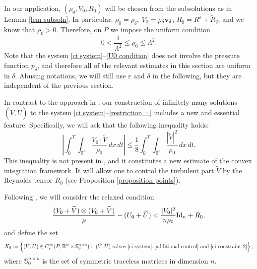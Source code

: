 \documentclass[12pt,reqno]{amsart}
\theoremstyle{definition}
\theoremstyle{remark}
\numberwithin{equation}{section}
\newcommand{\R}{{\mathbb R}}
\newcommand{\id}{\mathrm{Id}}
\renewcommand{\v}{{\bf v}}
\begin{document}
In our application, $(\rho_0, V_0, R_0)$ will be chosen from the subsolutions as in Lemma \ref{lem subsoln}. In particular, $\rho_0 = \rho_\delta$, $V_0 = \rho_\delta \v_\delta$, $R_0 = R^{\varepsilon}+\tilde{R}_{\delta}$, and we know that $\rho_0 > 0$. Therefore, on $P$ we impose the uniform condition
\begin{equation}
 \label{bounds rho}
 0<\frac{1}{\Lambda^2}\leq \rho_0\leq \Lambda^2.
 \end{equation}
Note that the system \eqref{ci system}--\eqref{U0 condition} does not involve the pressure function $p_\delta$, and therefore all of the relevant estimates in this section are uniform in $\delta$. Abusing notations, we will still use $\varepsilon$ and $\delta$ in the following, but they are independent of the previous section. 

In contrast to the approach in \cite{CVY}, our construction of infinitely many solutions $ (\widetilde{V}, \widetilde{U}) $ to the system \eqref{ci system}--\eqref{restriction =} includes a new and essential feature. Specifically, we will ask that the following  inequality holds:
\begin{equation}
\label{additional control}
\left|\int_0^T\int_{\mathbb{T}^3}\frac{V_0\cdot\widetilde{V}}{\rho_0}\,dx\,dt\right|\leq \frac{1}{8}\int_0^T\int_{\mathbb{T}^3} \frac{|\widetilde{V}|^2}{\rho_0}\,dx\,dt.
\end{equation}
This inequality is not present in \cite{CVY}, and it constitutes a new estimate of the convex integration framework. It will allow one to control the turbulent part $\widetilde V$ by the Reynolds tensor $R_0$ (see Proposition \ref{proposition points}).

\medskip

Following \cite{CDK,CVY,DS}, we will consider the relaxed condition
\begin{equation}
\label{ci constraint 2}
\frac{(V_0 + \widetilde{V}) \otimes (V_0 + \widetilde{V})} { \rho} - (U_0 + \widetilde U) < {|V_0|^2 \over n\rho_0} \id_n + R_0,
\end{equation}
and define the set 
\begin{equation}\label{defn X_0}
X_0 := \left\{ (\widetilde V, \widetilde U) \in C^\infty_c(P; \R^n \times \mathbb{S}^{n\times n}_0): \ (\widetilde V, \widetilde U) \text{ solves } \eqref{ci system},   \eqref{additional control} \text{ and } \eqref{ci constraint 2} \right\},
\end{equation}
where $\mathbb{S}^{n \times n}_0$ is the set of symmetric traceless matrices in dimension $n$. 
\end{document}
